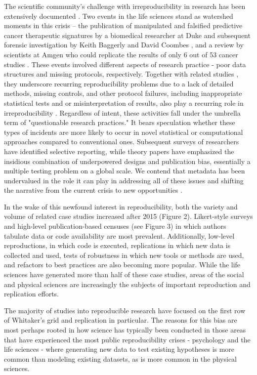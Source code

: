 \documentclass{drexelthesis}
\begin{document}
The scientific community’s challenge with irreproducibility in research has been extensively documented \cite{Baker2016-ri}. Two events in the life sciences stand as watershed moments in this crisis – the publication of manipulated and falsified predictive cancer therapeutic signatures by a biomedical researcher at Duke and subsequent forensic investigation by Keith Baggerly and David Coombes \cite{Baggerly2010-qy}, and a review by scientists at Amgen who could replicate the results of only 6 out of 53 cancer studies \cite{Begley2012-mt}. These events involved different aspects of research practice - poor data structures and missing protocols, respectively. Together with related studies \cite{Ioannidis2009-at}, they underscore recurring reproducibility problems due to a lack of detailed methods, missing controls, and other protocol failures, including inappropriate statistical tests and or misinterpretation of results, also play a recurring role in irreproducibility \cite{Motulsky2014-vg}. Regardless of intent, these activities fall under the umbrella term of "questionable research practices." It bears speculation whether these types of incidents are more likely to occur in novel statistical or computational approaches compared to conventional ones. Subsequent surveys of researchers \cite{Baker2016-ri} have identified selective reporting, while theory papers \cite{Ioannidis2005-se} have emphasized the insidious combination of underpowered designs and publication bias, essentially a multiple testing problem on a global scale. We contend that metadata has been undervalued in the role it can play in addressing all of these issues and shifting the narrative from the current crisis to new opportunities \cite{Fanelli2018-ek}.

In the wake of this newfound interest in reproducibility, both the variety and volume of related case studies increased after 2015 (Figure 2). Likert-style surveys and high-level publication-based censuses (see Figure 3) in which authors tabulate data or code availability are most prevalent. Additionally, low-level reproductions, in which code is executed, replications in which new data is collected and used, tests of robustness in which new tools or methods are used, and refactors to best practices are also becoming more popular. While the life sciences have generated more than half of these case studies, areas of the social and physical sciences are increasingly the subjects of important reproduction and replication efforts. 

The majority of studies into reproducible research have focused on the first row of Whitaker's grid and replication in particular. The reasons for this bias are most perhaps rooted in how science has typically been conducted in those areas that have experienced the most public reproducibility crises - psychology and the life sciences  - where generating new data to test existing hypotheses is more common than modeling existing datasets, as is more common in the physical sciences.
\end{document}
